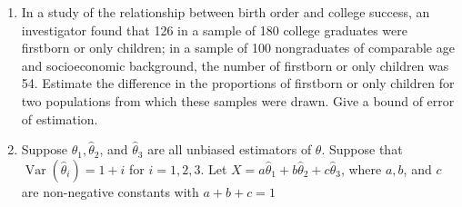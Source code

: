 \documentclass[12pt]{article}
\newcommand{\pars}[1]{\left( {#1} \right) }
\newcommand*{\Var}[1]{\operatorname{Var}(#1)}
\begin{document}
\begin{enumerate}
    
    \newpage
    \item
    In a study of the relationship between birth order and college success, an investigator
    found that 126 in a sample of 180 college graduates were firstborn or only children; in
    a sample of 100 nongraduates of comparable age and socioeconomic background, the
    number of firstborn or only children was 54. Estimate the difference in the proportions
    of firstborn or only children for two populations from which these samples were drawn.
    Give a bound of error of estimation.
    
    
    
    \newpage
    \item
    Suppose $\hat{\theta}_1, \hat{\theta}_2$, and $\hat{\theta}_3$ are all unbiased estimators of $\theta$. Suppose that $\Var{\hat{\theta}_i} = 1 + i$ for $i = 1, 2, 3$. Let $X = a\hat{\theta}_1 + b\hat{\theta}_2 + c\hat{\theta}_3$, where $a, b$, and $c$ are non-negative constants with $a + b + c = 1$
    \begin{enumerate}
        

\end{enumerate}
\end{enumerate}
\end{document}
